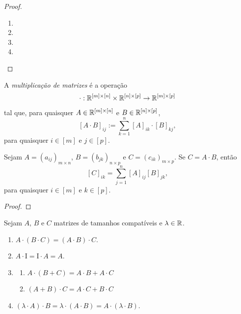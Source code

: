 \begin{proof}
    \leavevmode
        \begin{enumerate}[leftmargin=*, align=left, label=\textbf{(\alph*)}]
            \item
            \item
            \item
            \item 
        \end{enumerate}
\end{proof}

\begin{definition}
    A \emph{multiplicação de matrizes} é a operação
        \[
            \cdot : \mathbb{R}^{[m] \times [n]} \times \mathbb{R}^{[n] \times [p]} \to \mathbb{R}^{[m] \times [p]}
        \]
    tal que, para quaisquer $A \in \mathbb{R}^{[m] \times [n]}$ e $B \in \mathbb{R}^{[n] \times [p]}$,
        \[
            [A \cdot B]_{ij} := \sum_{k=1}^{n} [A]_{ik} \cdot [B]_{kj},
        \]
    para quaisquer $i \in [m]$ e $j \in [p]$.
\end{definition}

\begin{proposition}
    Sejam $A = (a_{ij})_{m \times n}$, $B = (b_{jk})_{n \times p}$ e $C = (c_{ik})_{m \times p}$. Se $C = A \cdot B$, então
        \[
            [C]_{ik} = \sum_{j=1}^{n} [A]_{ij} [B]_{jk},
        \]
    para quaisquer $i \in [m]$ e $k \in [p]$.
\end{proposition}

\begin{proof}
    \blackproof
\end{proof}

\begin{proposition}
    Sejam $A$, $B$ e $C$ matrizes de tamanhos compatíveis e $\lambda \in \mathbb{R}$.
        \begin{enumerate}[leftmargin=*, align=left, label=\textbf{(\alph*)}]
            \item $A \cdot (B \cdot C) = (A \cdot B) \cdot C$.
            \item $A \cdot \mathrm{I} = \mathrm{I} \cdot A = A$.
            \item 
                \begin{enumerate}[label=\roman*.]
                    \item $A \cdot (B+C) = A \cdot B + A \cdot C$
                    \item $(A+B) \cdot C = A \cdot C + B \cdot C$
                \end{enumerate}
            \item $(\lambda \cdot A) \cdot B = \lambda \cdot (A \cdot B) = A \cdot (\lambda \cdot B)$.
        \end{enumerate}
\end{proposition}

